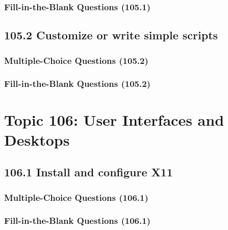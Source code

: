\documentclass[a4paper]{report}
\begin{document}
\subsubsection*{Fill-in-the-Blank Questions (105.1)}

\subsection*{105.2 Customize or write simple scripts}
\subsubsection*{Multiple-Choice Questions (105.2)}

\subsubsection*{Fill-in-the-Blank Questions (105.2)}


\section*{Topic 106: User Interfaces and Desktops}

\subsection*{106.1 Install and configure X11}
\subsubsection*{Multiple-Choice Questions (106.1)}

\subsubsection*{Fill-in-the-Blank Questions (106.1)}

\end{document}
